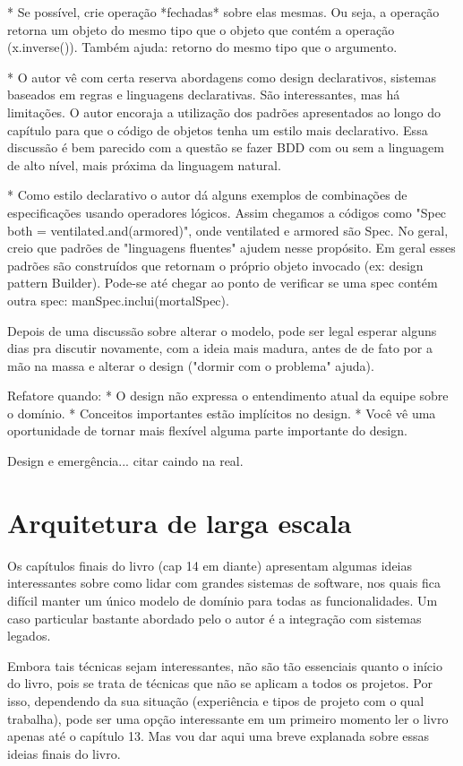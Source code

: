 \documentclass[a4paper, 12pt]{article}
\begin{document}
* Se possível, crie operação *fechadas* sobre elas mesmas. Ou seja, a operação retorna um objeto do mesmo tipo que o objeto que contém a operação (x.inverse()). Também ajuda: retorno do mesmo tipo que o argumento.

* O autor vê com certa reserva abordagens como design declarativos, sistemas baseados em regras e linguagens declarativas. São interessantes, mas há limitações. O autor encoraja a utilização dos padrões apresentados ao longo do capítulo para que o código de objetos tenha um estilo mais declarativo. Essa discussão é bem parecido com a questão se fazer BDD com ou sem a linguagem de alto nível, mais próxima da linguagem natural.

* Como estilo declarativo o autor dá alguns exemplos de combinações de especificações usando operadores lógicos. Assim chegamos a códigos como "Spec both = ventilated.and(armored)", onde ventilated e armored são Spec. No geral, creio que padrões de "linguagens fluentes" ajudem nesse propósito. Em geral esses padrões são construídos que retornam o próprio objeto invocado (ex: design pattern Builder). Pode-se até chegar ao ponto de verificar se uma spec contém outra spec: manSpec.inclui(mortalSpec).

Depois de uma discussão sobre alterar o modelo, pode ser legal esperar alguns dias pra discutir novamente, com a ideia mais madura, antes de de fato por a mão na massa e alterar o design ("dormir com o problema" ajuda).

Refatore quando:
* O design não expressa o entendimento atual da equipe sobre o domínio.
* Conceitos importantes estão implícitos no design.
* Você vê uma oportunidade de tornar mais flexível alguma parte importante do design.

Design e emergência... citar caindo na real.

\section{Arquitetura de larga escala}

Os capítulos finais do livro (cap 14 em diante) apresentam algumas ideias interessantes sobre como lidar com grandes sistemas de software, nos quais fica difícil manter um único modelo de domínio para todas as funcionalidades. Um caso particular bastante abordado pelo o autor é a integração com sistemas legados.

Embora tais técnicas sejam interessantes, não são tão essenciais quanto o início do livro, pois se trata de técnicas que não se aplicam a todos os projetos. Por isso, dependendo da sua situação (experiência e tipos de projeto com o qual trabalha), pode ser uma opção interessante em um primeiro momento ler o livro apenas até o capítulo 13. Mas vou dar aqui uma breve explanada sobre essas ideias finais do livro.





  
\end{document}
